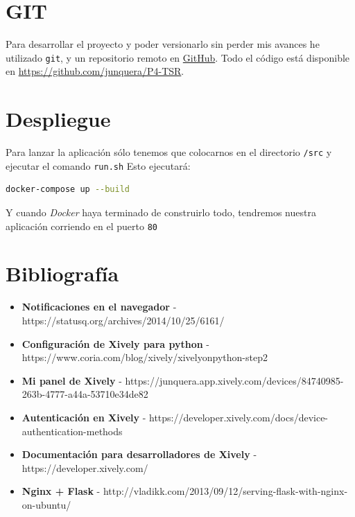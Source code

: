 \documentclass{article}
\begin{document}
\section{GIT}

Para desarrollar el proyecto y poder versionarlo sin perder mis avances he utilizado \texttt{git}, y un repositorio remoto en \href{https://github.com}{GitHub}. Todo el código está disponible en \href{https://github.com/junquera/P4-TSR}{https://github.com/junquera/P4-TSR}.

\section{Despliegue}

Para lanzar la aplicación sólo tenemos que colocarnos en el directorio  \texttt{/src} y ejecutar el comando \texttt{run.sh} Esto ejecutará:


\begin{lstlisting}[language=bash]
docker-compose up --build
\end{lstlisting}

Y cuando \emph{Docker} haya terminado de construirlo todo, tendremos nuestra aplicación corriendo en el puerto \texttt{80}

\section{Bibliografía}


\begin{itemize}
\item \textbf{Notificaciones en el navegador} -  https://statusq.org/archives/2014/10/25/6161/

\item \textbf{Configuración de Xively para python} -  https://www.coria.com/blog/xively/xivelyonpython-step2

\item \textbf{Mi panel de Xively} -  https://junquera.app.xively.com/devices/84740985-263b-4777-a44a-53710e34de82

\item \textbf{Autenticación en Xively} -  https://developer.xively.com/docs/device-authentication-methods

\item \textbf{Documentación para desarrolladores de Xively} -  https://developer.xively.com/

\item \textbf{Nginx + Flask} -  http://vladikk.com/2013/09/12/serving-flask-with-nginx-on-ubuntu/

\end{itemize}
\end{document}
